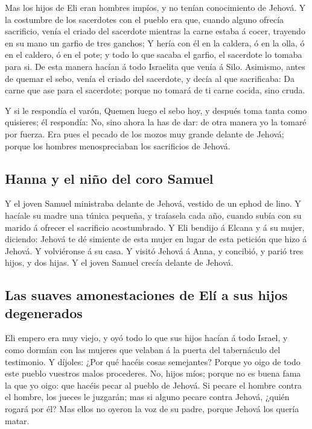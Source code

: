  Mas los hijos de Eli eran hombres impíos, y no tenían
conocimiento de Jehová.  Y la costumbre de los sacerdotes
con el pueblo era que, cuando alguno ofrecía sacrificio, venía el criado
del sacerdote mientras la carne estaba á cocer, trayendo en su mano un
garfio de tres ganchos;  Y hería con él en la caldera, ó
en la olla, ó en el caldero, ó en el pote; y todo lo que sacaba el
garfio, el sacerdote lo tomaba para si. De esta manera hacían á todo
Israelita que venía á Silo.  Asimismo, antes de quemar el
sebo, venía el criado del sacerdote, y decía al que sacrificaba: Da
carne que ase para el sacerdote; porque no tomará de ti carne cocida,
sino cruda.

 Y si le respondía el varón, Quemen luego el sebo hoy, y
después toma tanta como quisieres; él respondía: No, sino ahora la has
de dar: de otra manera yo la tomaré por fuerza.  Era pues
el pecado de los mozos muy grande delante de Jehová; porque los hombres
menospreciaban los sacrificios de Jehová.

\hypertarget{hanna-y-el-niuxf1o-del-coro-samuel}{%
\subsection{Hanna y el niño del coro
Samuel}\label{hanna-y-el-niuxf1o-del-coro-samuel}}

 Y el joven Samuel ministraba delante de Jehová, vestido
de un ephod de lino.  Y hacíale su madre una túnica
pequeña, y traíasela cada año, cuando subía con su marido á ofrecer el
sacrificio acostumbrado.  Y Eli bendijo á Elcana y á su
mujer, diciendo: Jehová te dé simiente de esta mujer en lugar de esta
petición que hizo á Jehová. Y volviéronse á su casa.  Y
visitó Jehová á Anna, y concibió, y parió tres hijos, y dos hijas. Y el
joven Samuel crecía delante de Jehová.

\hypertarget{las-suaves-amonestaciones-de-eluxed-a-sus-hijos-degenerados}{%
\subsection{Las suaves amonestaciones de Elí a sus hijos
degenerados}\label{las-suaves-amonestaciones-de-eluxed-a-sus-hijos-degenerados}}

 Eli empero era muy viejo, y oyó todo lo que sus hijos
hacían á todo Israel, y como dormían con las mujeres que velaban á la
puerta del tabernáculo del testimonio.  Y díjoles: ¿Por
qué hacéis cosas semejantes? Porque yo oigo de todo este pueblo vuestros
malos procederes.  No, hijos míos; porque no es buena
fama la que yo oigo: que hacéis pecar al pueblo de Jehová.
 Si pecare el hombre contra el hombre, los jueces le
juzgarán; mas si alguno pecare contra Jehová, ¿quién rogará por él? Mas
ellos no oyeron la voz de su padre, porque Jehová los quería matar.

